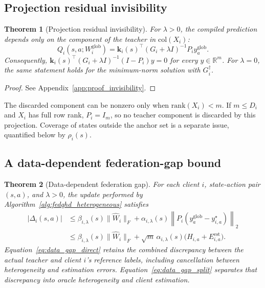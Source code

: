 \documentclass[sigconf,anonymous]{aamas}
\theoremstyle{plain}
\newtheorem{theorem}{Theorem}
\theoremstyle{definition}
\theoremstyle{remark}
\begin{document}
\subsection{Projection residual invisibility}

\begin{theorem}[Projection residual invisibility]
\label{thm:invisibility}
For $\lambda>0$, the compiled prediction depends only on the component of
the teacher in $\mathrm{col}(X_i)$:
\[
Q_i(s,a;W_i^{\mathrm{glob}})
=
\mathbf k_i(s)^\top(G_i+\lambda I)^{-1}
P_i y^{\mathrm{glob}}_a.
\]
Consequently,
$\mathbf k_i(s)^\top(G_i+\lambda I)^{-1}(I-P_i)y=0$
for every $y\in\mathbb R^m$.  For $\lambda=0$, the same statement holds
for the minimum-norm solution with $G_i^\dagger$.
\end{theorem}

\begin{proof}
See Appendix~\ref{app:proof_invisibility}.
\end{proof}

The discarded component can be nonzero only when
$\mathrm{rank}(X_i)<m$.  If $m\le D_i$ and $X_i$ has full row rank,
$P_i=I_m$, so no teacher component is discarded by this projection.
Coverage of states outside the anchor set is a separate issue,
quantified below by $\rho_i(s)$.

\subsection{A data-dependent federation-gap bound}

\begin{theorem}[Data-dependent federation gap]
\label{thm:fed_gap_main}
For each client $i$, state-action pair $(s,a)$, and $\lambda>0$, the
update performed by Algorithm~\ref{alg:fedqhd_heterogeneous} satisfies
\begin{align}
|\Delta_i(s,a)|
&\le
\beta_{i,\lambda}(s)\|\hat W_i\|_F
+
\alpha_{i,\lambda}(s)
\left\|P_i(y^{\mathrm{glob}}_a-y^\star_{i,a})\right\|_2
\label{eq:data_gap_direct}\\
&\le
\beta_{i,\lambda}(s)\|\hat W_i\|_F
+
\sqrt m\,\alpha_{i,\lambda}(s)
\bigl(H_{i,a}+E_{i,a}^{\mathrm{est}}\bigr).
\label{eq:data_gap_split}
\end{align}
Equation~\eqref{eq:data_gap_direct} retains the combined discrepancy
between the actual teacher and client $i$'s reference labels, including
cancellation between heterogeneity and estimation errors.
Equation~\eqref{eq:data_gap_split} separates that discrepancy
into oracle heterogeneity and client estimation.
\end{theorem}
\end{document}
